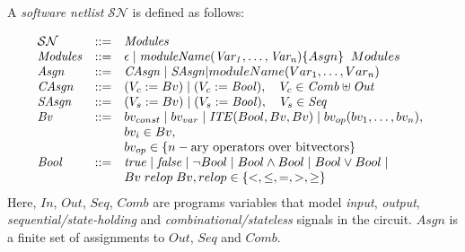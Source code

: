 \documentclass[sigconf]{acmart}
\newcommand{\sjcmt}[1]{{\color{blue} [{#1}]}}
\newcommand{\Omit}[1]{}
\begin{document}
A \textit{software netlist} $\mathcal{SN}$ is defined as follows:
\Omit{
a four-tuple $\langle L, A, l_0, l_e
\rangle$, where $L$ is a finite set of locations, modelling the values of
the program counter in the corresponding sequential code, $l_0 \in L$ is the initial
location, $l_e \in L$ is the error location, and $A \subseteq L \times M
\times L$ is the control flow automaton.  The edges in $A$ are labelled
with a quantifier-free first-order formula over program variables drawn from
the set $M$. These formulas encode an assignment and
take the form $\langle \mathit{In}, \mathit{Out},
\mathit{Seq}, \mathit{Comb}, \mathit{Asgn} \rangle$,
\sjcmt{$M$ is confusing. Is it a set of first order formula
or a set of $Asgn$?}
}
%
\[ 
\begin{array}[t]{@{}lll}
\mathcal{SN} & {:}{:}{=} & \mathit{Modules} \\
\mathit{Modules} & {:}{:}{=} & \epsilon \mid \mathit{moduleName(Var_1,\dots,Var_n)} \{ Asgn \} \;\; Modules \\
\mathit{Asgn} &  {:}{:}{=} & \mathit{CAsgn} \mid \mathit{SAsgn} | moduleName(Var_1,\dots,Var_n)\\
\mathit{CAsgn} & {:}{:}{=} & (V_c := Bv) \mid (V_c := \mathit{Bool}), \quad V_c \in \mathit{Comb} \uplus \mathit{Out} \\
\mathit{SAsgn} & {:}{:}{=} & (V_s := Bv) \mid (V_s := \mathit{Bool}), \quad V_s \in \mathit{Seq} \\
\mathit{Bv} &  {:}{:}{=} & bv_{const} \mid bv_{var} \mid
	\mathit{ITE}(Bool, Bv, Bv) \mid
bv_{op}(bv_1, \ldots, bv_n), \\
& & bv_i \in Bv, \\ 
& & bv_{op} \in \{n-\text{ary operators over bitvectors} \} \\
\mathit{Bool} & {:}{:}{=} & \mathit{true} \mid \mathit{false} \mid \neg{Bool} \mid Bool \land Bool \mid 
Bool \lor Bool \mid \\ 
& & Bv\; relop\; Bv, relop \in \{<,\leq,=,>,\geq\} \\
\end{array}
\]
%
Here, $\mathit{In}$, $\mathit{Out}$, $\mathit{Seq}$, $\mathit{Comb}$
are programs variables that model \emph{input}, \emph{output}, 
\emph{sequential/state-holding} and \emph{combinational/stateless} 
signals in the circuit.  $Asgn$ is a finite set of assignments 
to $Out$, $Seq$ and $Comb$. 

\Omit{
A state transition in HW can be described by a set of register updates,
defined by the next-state function, and assignment of non-deterministic 
values to external inputs. The state transition in the software netlist 
corresponds to updates to the variables in $Seq$ and explicit assignment 
of non-deterministic values to the input variables, $In$.
}
\end{document}
